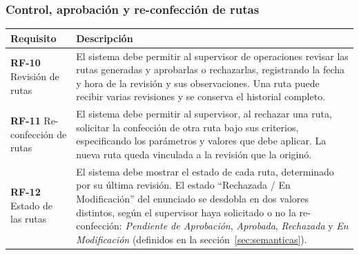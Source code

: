 \documentclass[11pt,a4paper]{article}
\begin{document}
\subsubsection{Control, aprobación y re-confección de rutas}
\begin{longtable}{P{0.30\textwidth}P{0.64\textwidth}}
\toprule
\textbf{Requisito} & \textbf{Descripción}\\ \midrule
\endhead
\textbf{RF-10} Revisión de rutas & El sistema debe permitir al supervisor de operaciones revisar las rutas generadas y aprobarlas o rechazarlas, registrando la fecha y hora de la revisión y sus observaciones. Una ruta puede recibir varias revisiones y se conserva el historial completo.\\
\textbf{RF-11} Re-confección de rutas & El sistema debe permitir al supervisor, al rechazar una ruta, solicitar la confección de otra ruta bajo sus criterios, especificando los parámetros y valores que debe aplicar. La nueva ruta queda vinculada a la revisión que la originó.\\
\textbf{RF-12} Estado de las rutas & El sistema debe mostrar el estado de cada ruta, determinado por su última revisión. El estado ``Rechazada / En Modificación'' del enunciado se desdobla en dos valores distintos, según el supervisor haya solicitado o no la re-confección: \textit{Pendiente de Aprobación}, \textit{Aprobada}, \textit{Rechazada} y \textit{En Modificación} (definidos en la sección~\ref{sec:semanticas}).\\
\bottomrule
\end{longtable}
\end{document}
